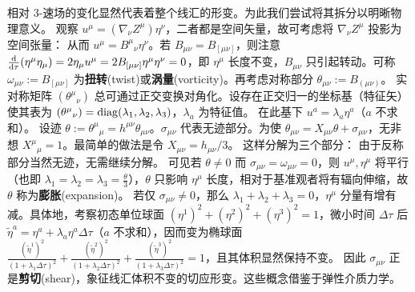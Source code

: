 相对 3-速场的变化显然代表着整个线汇的形变。为此我们尝试将其拆分以明晰物理意义。
观察 $u^\mu=(\nabla_\nu Z^\mu)\eta^\nu$，二者都是空间矢量，故可考虑将 $\nabla_\nu Z^\mu$ 投影为空间张量：
从而 $u^\mu= B^\mu{}_\nu\eta^\nu$。若 $B_{\mu\nu}=B_{[\mu\nu]}$，则注意 $\dv{\tau}(\eta^\mu\eta_\mu)=2\eta_\mu u^\mu=2 B_{[\mu\nu]} \eta^\mu\eta^\nu = 0$，即 $\eta^\mu$ 长度不变，$B_{\mu\nu}$ 只引起转动。可称 $\omega_{\mu\nu}:=B_{[\mu\nu]}$ 为\textbf{扭转}(twist)或\textbf{涡量}(vorticity)。再考虑对称部分 $\theta_{\mu\nu}:=B_{(\mu\nu)}$。
实对称矩阵 $(\theta^\mu{}_\nu)$ 总可通过正交变换对角化。设存在正交归一的坐标基（特征矢）使其表为 $(\theta^\mu{}_\nu)=\operatorname{diag}(\lambda_1,\lambda_2,\lambda_3)$，$\lambda_a$ 为特征值。
在此基下 $u^a = \lambda_a \eta^a$（$a$ 不求和）。
设迹 $\theta:=\theta^\mu{}_\mu = h^{\mu\nu} \theta_{\mu\nu}$。$\sigma_{\mu\nu}$ 代表无迹部分。为使 $\theta_{\mu\nu}=X_{\mu\nu}\theta+\sigma_{\mu\nu}$，无非想 $X^{\mu}{}_{\mu}=1$。最简单的做法是令 $X_{\mu\nu}=h_{\mu\nu}/3$。
这样分解为三个部分：
由于反称部分当然无迹，无需继续分解。
可见若 $\theta\ne 0$ 而 $\sigma_{\mu\nu}=\omega_{\mu\nu}=0$，则 $u^\mu,\eta^\mu$ 将平行（也即 $\lambda_1=\lambda_2=\lambda_3 = \frac{\theta}{3}$），$\theta$ 只影响 $\eta^\mu$ 长度，相对于基准观者将有辐向伸缩，故 $\theta$ 称为\textbf{膨胀}(expansion)。
若仅 $\sigma_{\mu\nu}\ne 0$，那么 $\lambda_1+\lambda_2+\lambda_3 = 0$，$\eta^\mu$ 分量有增有减。具体地，考察初态单位球面 $(\eta^1)^2+(\eta^2)^2+(\eta^3)^2=1$，微小时间 $\Delta\tau$ 后 $\tilde\eta^a=\eta^a+\lambda_a\eta^a\Delta\tau$（$a$ 不求和），因而变为椭球面 $\frac{(\tilde\eta^1)^2}{(1+\lambda_1\Delta\tau)^2}+\frac{(\tilde\eta^2)^2}{(1+\lambda_2\Delta\tau)^2}+\frac{(\tilde\eta^3)^2}{(1+\lambda_3\Delta\tau)^2}=1$，且其体积显然保持不变。
因此 $\sigma_{\mu\nu}$ 正是\textbf{剪切}(shear)，象征线汇体积不变的切应形变。这些概念借鉴于弹性介质力学。

